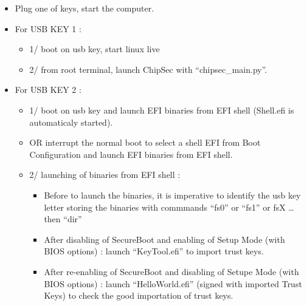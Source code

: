 \begin{itemize}
\item
  Plug one of keys, start the computer.
\item
  For USB KEY 1 :

  \begin{itemize}
  \tightlist
  \item
    1/ boot on usb key, start linux live
  \item
    2/ from root terminal, launch ChipSec with ``chipsec\_main.py''.
  \end{itemize}
\item
  For USB KEY 2 :

  \begin{itemize}
  \tightlist
  \item
    1/ boot on usb key and launch EFI binaries from EFI shell (Shell.efi
    is automaticaly started).
  \item
    OR interrupt the normal boot to select a shell EFI from Boot
    Configuration and launch EFI binaries from EFI shell.
  \item
    2/ launching of binaries from EFI shell :

    \begin{itemize}
    \tightlist
    \item
      Before to launch the binaries, it is imperative to identify the
      usb key letter storing the binaries with commmands ``fs0'' or
      ``fs1'' or fsX \ldots{} then ``dir''
    \item
      After disabling of SecureBoot and enabling of Setup Mode (with
      BIOS options) : launch ``KeyTool.efi'' to import trust keys.
    \item
      After re-enabling of SecureBoot and disabling of Setupe Mode (with
      BIOS options) : launch ``HelloWorld.efi'' (signed with imported
      Trust Keys) to check the good importation of trust keys.
    \end{itemize}
  \end{itemize}
\end{itemize}
